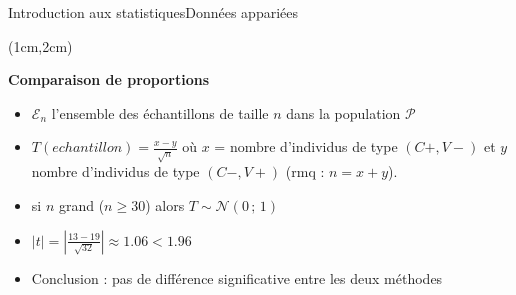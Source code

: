 \documentclass{beamer}
\begin{document}
\begin{frame}{Introduction aux statistiques}{Données appariées}
\begin{textblock*}{\textwidth}(1cm,2cm)

\begin{center}{\bf \Large Comparaison de proportions } \end{center}



 
 \begin{itemize}
 \item $\mathcal{E}_n$ l'ensemble des échantillons de taille $n$ dans la population $\mathcal{P}$
 \item $ T(echantillon) = \frac{x-y}{\sqrt{n}}$
où $x$ = nombre d'individus  de type $(C+,V-)$ et $y$  nombre d'individus  de type $(C-,V+)$ (rmq : $n=x+y$).
 \item si $n$  grand ($n\geq 30$) alors  $T\sim\mathcal{N}(0\,;\,1)$
 \item $|t|=\left|\frac{13-19}{\sqrt{32}}\right| \approx 1.06<1.96$
 \item Conclusion : pas de différence significative entre les deux méthodes
 \end{itemize}


\end{textblock*}

\end{frame}



\end{document}
